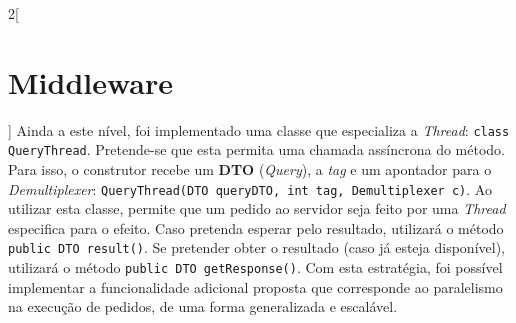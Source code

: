 \documentclass[a4paper,11pt]{scrreprt}
\begin{document}
\begin{multicols}{2}[\section{Middleware}]
    Ainda a este nível, foi implementado uma classe que especializa a \textit{Thread}:
    \texttt{class QueryThread}.
    Pretende-se que esta permita uma chamada assíncrona do método.
    Para isso, o construtor recebe um \textbf{DTO} (\textit{Query}), a \textit{tag}
    e um apontador para o \textit{Demultiplexer}: 
    \texttt{QueryThread(DTO queryDTO, int tag, Demultiplexer c)}.
    Ao utilizar esta classe, permite que um pedido ao servidor seja feito
    por uma \textit{Thread} especifica para o efeito.
    Caso pretenda esperar pelo resultado, utilizará o método \texttt{public DTO result()}.
    Se pretender obter o resultado (caso já esteja disponível), utilizará o método
    \texttt{public DTO getResponse()}.
    Com esta estratégia, foi possível implementar a funcionalidade adicional proposta
    que corresponde ao paralelismo na execução de pedidos, de uma forma generalizada e escalável.    
    
\end{multicols}
\end{document}
